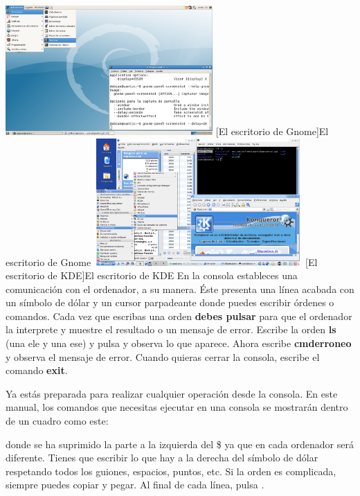 \begin{center}
\begin{minipage}{16.947cm}
\includegraphics[width=7.915cm,height=4.946cm]{manual-img6.png}
[El escritorio de Gnome]{El escritorio de Gnome}
\includegraphics[width=7.953cm,height=4.868cm]{manual-img7.png}
[El escritorio de KDE]{El escritorio de KDE}
En la consola estableces una comunicación con el ordenador, a su
manera. Éste presenta una línea acabada con un símbolo de dólar
y un cursor parpadeante donde puedes escribir órdenes o comandos.
Cada vez que escribas una orden \textbf{debes pulsar}
 para que el ordenador la interprete
y muestre el resultado o un mensaje de error. Escribe la orden
\textbf{ls} (una ele y una ese) y pulsa
y observa lo que aparece. Ahora
escribe \textbf{cmderroneo} y observa el mensaje de error. Cuando
quieras cerrar la consola, escribe el comando \textbf{exit}.

Ya estás preparada para realizar cualquier operación desde la
consola. En este manual, los comandos que necesitas ejecutar en una
consola se mostrarán dentro de un cuadro como este:

donde se ha suprimido la parte a la izquierda del \$ ya que en cada
ordenador será diferente. Tienes que escribir lo que hay a la derecha
del símbolo de dólar respetando todos los guiones, espacios,
puntos, etc. Si la orden es complicada, siempre puedes copiar y pegar.
Al final de cada línea, pulsa .
\begin{minipage}{16.489cm}

\ \ 
\end{minipage}\end{minipage}
\end{center}
